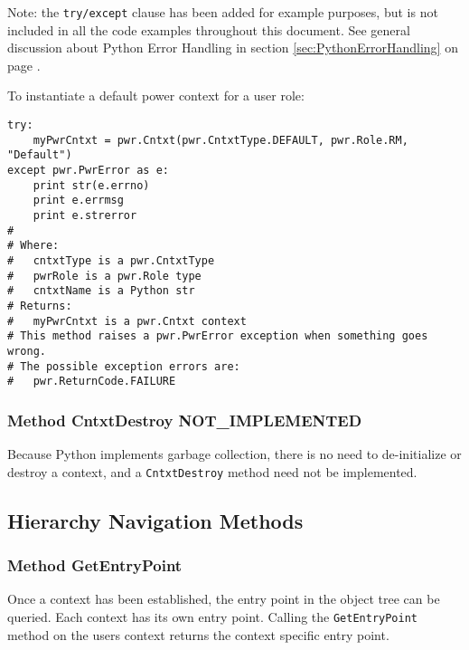 Note: the \texttt{try/except} clause has been added for example purposes, but
is not included in all the code examples throughout this document.  See general
discussion about Python Error Handling in section \ref{sec:PythonErrorHandling}
on page \pageref{sec:PythonErrorHandling}.

To instantiate a default power context for a user role:

\begin{center}\begin{minipage}{.95\linewidth}\begin{lstlisting}
try:
    myPwrCntxt = pwr.Cntxt(pwr.CntxtType.DEFAULT, pwr.Role.RM, "Default")
except pwr.PwrError as e:
    print str(e.errno)
    print e.errmsg
    print e.strerror
#
# Where:
#   cntxtType is a pwr.CntxtType
#   pwrRole is a pwr.Role type
#   cntxtName is a Python str
# Returns:
#   myPwrCntxt is a pwr.Cntxt context
# This method raises a pwr.PwrError exception when something goes wrong.
# The possible exception errors are:
#   pwr.ReturnCode.FAILURE
\end{lstlisting}\end{minipage}\end{center}

\subsubsection{Method CntxtDestroy NOT_IMPLEMENTED} \label{meth:CntxtDestroy}

Because Python implements garbage collection, there is no need to de-initialize or
destroy a context, and a \texttt{CntxtDestroy} method need not be implemented.

\subsection{Hierarchy Navigation Methods}
\label{sec:PythonHierarchyNavigationMethods}

\subsubsection{Method GetEntryPoint} \label{meth:GetEntryPoint}

Once a context has been established, the entry point in the object tree can
be queried. Each context has its own entry point. Calling the
\texttt{GetEntryPoint} method on the users context returns the context specific
entry point.

